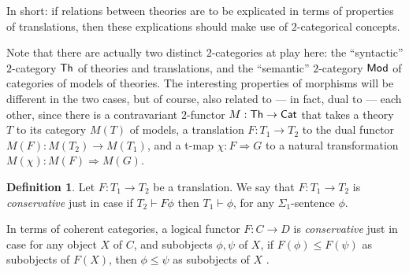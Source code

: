 \documentclass[12pt]{article}
\theoremstyle{definition}
\newtheorem*{defn}{Definition}
\theoremstyle{remark}
\newcommand{\3}{\mathcal}
\begin{document}
In short: if relations between theories are to be explicated in terms
of properties of translations, then these explications should make use
of $2$-categorical concepts.

Note that there are actually two distinct $2$-categories at play here:
the ``syntactic'' $2$-category $\mathsf{Th}$ of theories and translations,
and the ``semantic'' $2$-category $\mathsf{Mod}$ of categories of models of
theories. The interesting properties of morphisms will be different in
the two cases, but of course, also related to --- in fact, dual to ---
each other, since there is a contravariant $2$-functor
$M:\mathsf{Th}\to\mathsf{Cat}$ that takes a theory $T$ to its category $M(T)$ of
models, a translation $F:T_1\to T_2$ to the dual functor
$M(F):M(T_2)\to M(T_1)$, and a t-map $\chi : F\Rightarrow G$ to a
natural transformation $M(\chi ):M(F)\Rightarrow M(G)$.

\begin{defn} Let $F:T_1\to T_2$ be a translation. We say that
  $F:T_1\to T_2$ is \emph{conservative} just in case if
  $T_2\vdash F\phi$ then $T_1\vdash \phi$, for any
  $\Sigma _1$-sentence $\phi$.

  In terms of coherent categories, a logical functor $F:C\to D$ is
  \emph{conservative} just in case for any object $X$ of $C$, and
  subobjects $\phi ,\psi$ of $X$, if $F(\phi )\leq F(\psi )$ as
  subobjects of $F(X)$, then $\phi\leq\psi$ as subobjects of $X$
  \citep[see][p 195]{makkai1977}. \end{defn}
\end{document}
